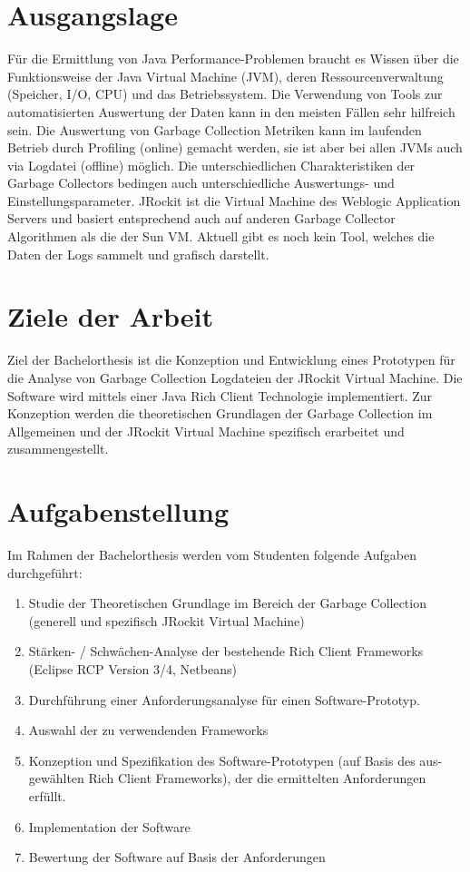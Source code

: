 \section{Ausgangslage}
Für die Ermittlung von Java Performance-Problemen braucht es Wissen über die Funktionsweise der Java Virtual Machine (JVM), deren Ressourcenverwaltung (Speicher, I/O, CPU) und das Betriebssystem. Die Verwendung von Tools zur automatisierten Auswertung der Daten kann in den meisten Fällen sehr hilfreich sein. 
Die Auswertung von Garbage Collection Metriken kann im laufenden Betrieb durch Profiling (online) gemacht werden, sie ist aber bei allen JVMs auch via Logdatei (offline) möglich. Die unterschiedlichen Charakteristiken der Garbage Collectors bedingen auch unterschiedliche Auswertungs- und Einstellungsparameter. 
JRockit ist die Virtual Machine des Weblogic Application Servers und basiert entsprechend auch auf anderen Garbage Collector Algorithmen als die der Sun VM. Aktuell gibt es noch kein Tool, welches die Daten der Logs sammelt und grafisch darstellt.


\section{Ziele der Arbeit}
Ziel der Bachelorthesis ist die Konzeption und Entwicklung eines Prototypen für die Analyse von Garbage Collection Logdateien der JRockit Virtual Machine. Die Software wird mittels einer Java Rich Client Technologie implementiert. Zur Konzeption werden die theoretischen Grundlagen der Garbage Collection im Allgemeinen und der JRockit Virtual Machine spezifisch erarbeitet und zusammengestellt.

\section{Aufgabenstellung}
Im Rahmen der Bachelorthesis werden vom Studenten folgende Aufgaben durchgeführt:

\begin{enumerate}
\item Studie der Theoretischen Grundlage im Bereich der Garbage Collection 
    (generell und spezifisch JRockit Virtual Machine)
\item Stärken- / Schwächen-Analyse der bestehende Rich Client Frameworks
    (Eclipse RCP Version 3/4, Netbeans)
\item Durchführung einer Anforderungsanalyse für einen Software-Prototyp.
\item Auswahl der zu verwendenden Frameworks
\item Konzeption und Spezifikation des Software-Prototypen (auf Basis des aus-
    gewählten Rich Client Frameworks), der die ermittelten Anforderungen erfüllt.  
\item Implementation der Software
\item Bewertung der Software auf Basis der Anforderungen
\end{enumerate}

